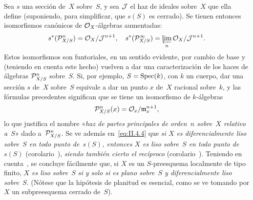 \begin{remarques}
Sea $s$ una sección de~$X$ sobre~$S$, y sea $\cal{J}$ el haz de ideales sobre~$X$ que ella define (suponiendo,
para simplificar, que $s(S)$ es cerrado). Se tienen entonces isomorfismos canónicos de $\cal{O}_X$-álgebras aumentadas:
\begin{equation}
\label{eq:II.4.4}
s^*(\cal{P}_{X/S}^n)=\cal{O}_X/\cal{J}^{n+1}\quoi,\quad
s^*(\cal{P}_{X/S}^{\infty})=\varprojlim_n
\cal{O}_X/\cal{J}^{n+1}.
\end{equation}
Estos isomorfismos son funtoriales, en un sentido evidente, por cambio de base y (teniendo en cuenta este hecho) vuelven a dar una caracterización de los haces de álgebras $\cal{P}_{X/S}^n$ sobre~$S$. Si, por ejemplo, $S=\Spec(k)$, con $k$ un cuerpo, dar una sección $s$ de~$X$ sobre~$S$ equivale a dar un punto $x$ de~$X$ racional sobre~$k$, y las fórmulas precedentes significan que se tiene un isomorfismo de $k$-álgebras
\begin{equation}
\label{eq:II.4.5}
\cal{P}_{X/S}^n(x)=\cal{O}_x/\goth{m}_x^{n+1},
\end{equation}
lo que justifica el nombre «\emph{haz de partes principales de orden~$n$ sobre~$X$ relativo a~$S$}»
%
\label{indnot:ad1}%
dado a~$\cal{P}_{X/S}^n$. Se ve además en~\eqref{eq:II.4.4} que \emph{si $X$ es diferencialmente liso sobre~$S$ en todo punto de~$s(S)$, entonces $X$ es liso sobre~$S$ en todo punto de~$s(S)$} (corolario~), \emph{siendo también cierto el recíproco} (corolario~). Teniendo en cuenta~, se concluye fácilmente que, si $X$ es un $S$-preesquema localmente de tipo finito, \emph{$X$ es liso sobre~$S$ si y solo si es plano sobre~$S$ y diferencialmente liso sobre~$S$}. (Nótese que la hipótesis de planitud es esencial, como se ve tomando por $X$ un subpreesquema cerrado de~$S$).


\end{remarques}
